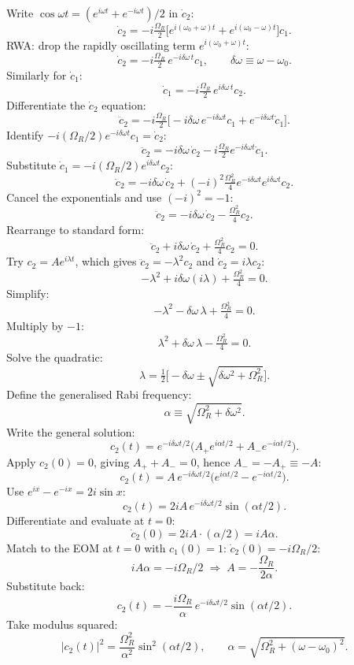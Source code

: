 \documentclass[11pt]{article}
\begin{document}
Write $\cos\omega t = (e^{i\omega t}+e^{-i\omega t})/2$ in $\dot c_2$:
\[
\dot c_2 = -i\tfrac{\Omega_R}{2}\bigl[e^{i(\omega_0+\omega)t} + e^{i(\omega_0-\omega)t}\bigr]c_1.
\]
RWA: drop the rapidly oscillating term $e^{i(\omega_0+\omega)t}$:
\[
\dot c_2 = -i\tfrac{\Omega_R}{2}\,e^{-i\delta\omega\, t} c_1,\qquad \delta\omega \equiv \omega-\omega_0.
\]
Similarly for $\dot c_1$:
\[
\dot c_1 = -i\tfrac{\Omega_R}{2}\,e^{i\delta\omega\, t} c_2.
\]
Differentiate the $\dot c_2$ equation:
\[
\ddot c_2 = -i\tfrac{\Omega_R}{2}\bigl[-i\delta\omega\, e^{-i\delta\omega t}c_1 + e^{-i\delta\omega t}\dot c_1\bigr].
\]
Identify $-i(\Omega_R/2)e^{-i\delta\omega t}c_1 = \dot c_2$:
\[
\ddot c_2 = -i\delta\omega\,\dot c_2 -i\tfrac{\Omega_R}{2}e^{-i\delta\omega t}\dot c_1.
\]
Substitute $\dot c_1 = -i(\Omega_R/2)e^{i\delta\omega t}c_2$:
\[
\ddot c_2 = -i\delta\omega\,\dot c_2 + (-i)^2\tfrac{\Omega_R^2}{4}e^{-i\delta\omega t}e^{i\delta\omega t}c_2.
\]
Cancel the exponentials and use $(-i)^2=-1$:
\[
\ddot c_2 = -i\delta\omega\,\dot c_2 - \tfrac{\Omega_R^2}{4}c_2.
\]
Rearrange to standard form:
\[
\ddot c_2 + i\delta\omega\,\dot c_2 + \tfrac{\Omega_R^2}{4}c_2 = 0.
\]
Try $c_2 = A e^{i\lambda t}$, which gives $\ddot c_2=-\lambda^2 c_2$ and $\dot c_2=i\lambda c_2$:
\[
-\lambda^2 + i\delta\omega(i\lambda) + \tfrac{\Omega_R^2}{4} = 0.
\]
Simplify:
\[
-\lambda^2 - \delta\omega\,\lambda + \tfrac{\Omega_R^2}{4} = 0.
\]
Multiply by $-1$:
\[
\lambda^2 + \delta\omega\,\lambda - \tfrac{\Omega_R^2}{4} = 0.
\]
Solve the quadratic:
\[
\lambda = \tfrac{1}{2}\bigl[-\delta\omega \pm\sqrt{\delta\omega^2+\Omega_R^2}\bigr].
\]
Define the generalised Rabi frequency:
\[
\alpha \equiv \sqrt{\Omega_R^2 + \delta\omega^2}.
\]
Write the general solution:
\[
c_2(t) = e^{-i\delta\omega t/2}\bigl(A_+ e^{i\alpha t/2} + A_- e^{-i\alpha t/2}\bigr).
\]
Apply $c_2(0)=0$, giving $A_+ + A_- = 0$, hence $A_- = -A_+ \equiv -A$:
\[
c_2(t) = A\,e^{-i\delta\omega t/2}\bigl(e^{i\alpha t/2} - e^{-i\alpha t/2}\bigr).
\]
Use $e^{ix}-e^{-ix}=2i\sin x$:
\[
c_2(t) = 2iA\,e^{-i\delta\omega t/2}\sin(\alpha t/2).
\]
Differentiate and evaluate at $t=0$:
\[
\dot c_2(0) = 2iA\cdot(\alpha/2) = iA\alpha.
\]
Match to the EOM at $t=0$ with $c_1(0)=1$: $\dot c_2(0)=-i\Omega_R/2$:
\[
iA\alpha = -i\Omega_R/2 \;\Longrightarrow\; A = -\frac{\Omega_R}{2\alpha}.
\]
Substitute back:
\[
c_2(t) = -\frac{i\Omega_R}{\alpha}\,e^{-i\delta\omega t/2}\sin(\alpha t/2).
\]
Take modulus squared:
\[
\boxed{\;|c_2(t)|^2 = \frac{\Omega_R^2}{\alpha^2}\sin^2(\alpha t/2),\qquad \alpha = \sqrt{\Omega_R^2 + (\omega-\omega_0)^2}.\;}
\]
\end{document}
